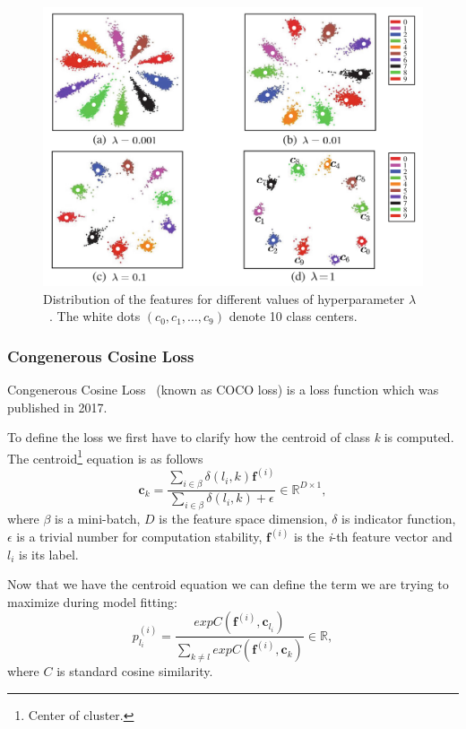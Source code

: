 \begin{figure}[H]
    \centering
    \includegraphics[width=\columnwidth]{images/face-recognition/centerlosslambda.png}
    \caption{Distribution of the features for different values of hyperparameter $\lambda$~\cite{CenterLoss}.
    The white dots $(c_0,c_1,\dots,c_9)$ denote 10 class centers.}
    \label{fig:centerlosslambda}
\end{figure}

\subsubsection{Congenerous Cosine Loss}
Congenerous Cosine Loss~\cite{CocoLoss} (known as COCO loss) is a loss function which was published in 2017.

To define the loss we first have to clarify how the centroid of class \textit{k} is computed.
The centroid\footnote{Center of cluster.} equation is as follows
\begin{equation}
    \boldsymbol{c}_{k} = \frac{\sum_{i \in \beta} \delta \left( l_i, k \right)\boldsymbol{f}^{(i)}}
    {\sum_{i \in \beta} \delta \left( l_i, k \right) + \epsilon} \in \mathbb{R}^{D \times 1},
\end{equation}
where $\beta$ is a mini-batch, $D$ is the feature space dimension, $\delta$ is indicator function, $\epsilon$ is a
trivial number for computation stability, $\boldsymbol{f}^{(i)}$ is the \textit{i}-th feature vector and $l_i$ is
its label.

Now that we have the centroid equation we can define the term we are trying to maximize during model fitting:
\begin{equation}
    p_{l_i}^{(i)} = \frac{exp C(\boldsymbol{f}^{(i)}, \boldsymbol{c}_{l_{i}})}
    {\sum_{k \neq l} exp C(\boldsymbol{f}^{(i)}, \boldsymbol{c}_{k})} \in \mathbb{R},
\end{equation}
where $C$ is standard cosine similarity.

